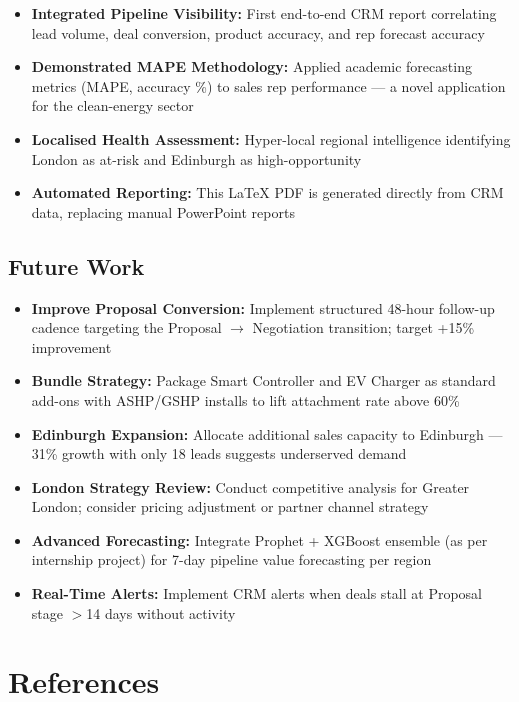 \documentclass[12pt,a4paper]{report}
\begin{document}
\begin{itemize}[noitemsep]
  \item \textbf{Integrated Pipeline Visibility:} First end-to-end CRM report correlating lead volume, deal conversion, product accuracy, and rep forecast accuracy
  \item \textbf{Demonstrated MAPE Methodology:} Applied academic forecasting metrics (MAPE, accuracy \%) to sales rep performance --- a novel application for the clean-energy sector
  \item \textbf{Localised Health Assessment:} Hyper-local regional intelligence identifying London as at-risk and Edinburgh as high-opportunity
  \item \textbf{Automated Reporting:} This \LaTeX{} PDF is generated directly from CRM data, replacing manual PowerPoint reports
\end{itemize}

\section{Future Work}

\begin{itemize}[noitemsep]
  \item \textbf{Improve Proposal Conversion:} Implement structured 48-hour follow-up cadence targeting the Proposal $\to$ Negotiation transition; target +15\% improvement
  \item \textbf{Bundle Strategy:} Package Smart Controller and EV Charger as standard add-ons with ASHP/GSHP installs to lift attachment rate above 60\%
  \item \textbf{Edinburgh Expansion:} Allocate additional sales capacity to Edinburgh --- 31\% growth with only 18 leads suggests underserved demand
  \item \textbf{London Strategy Review:} Conduct competitive analysis for Greater London; consider pricing adjustment or partner channel strategy
  \item \textbf{Advanced Forecasting:} Integrate Prophet + XGBoost ensemble (as per internship project) for 7-day pipeline value forecasting per region
  \item \textbf{Real-Time Alerts:} Implement CRM alerts when deals stall at Proposal stage $>$14 days without activity
\end{itemize}

\clearpage
\chapter*{References}
\end{document}
